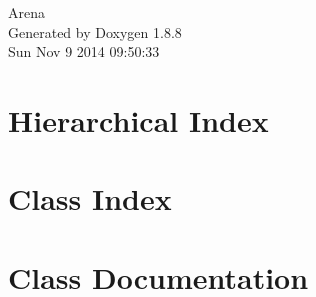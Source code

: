 \documentclass[twoside]{book}
\newcommand{\+}{\discretionary{\mbox{\scriptsize$\hookleftarrow$}}{}{}}
\newcommand{\clearemptydoublepage}{%
  \newpage{\pagestyle{empty}\cleardoublepage}%
}
\begin{document}
\hypersetup{pageanchor=false,
             bookmarks=true,
             bookmarksnumbered=true,
             pdfencoding=unicode
            }
\begin{titlepage}
\vspace*{7cm}
\begin{center}%
{\Large Arena }\\
\vspace*{1cm}
{\large Generated by Doxygen 1.8.8}\\
\vspace*{0.5cm}
{\small Sun Nov 9 2014 09:50:33}\\
\end{center}
\end{titlepage}
\clearemptydoublepage
\tableofcontents
\clearemptydoublepage
{}
\hypersetup{pageanchor=true}

\chapter{Hierarchical Index}

\chapter{Class Index}

\chapter{Class Documentation}

































\newpage
{}
{}
\printindex
\end{document}
